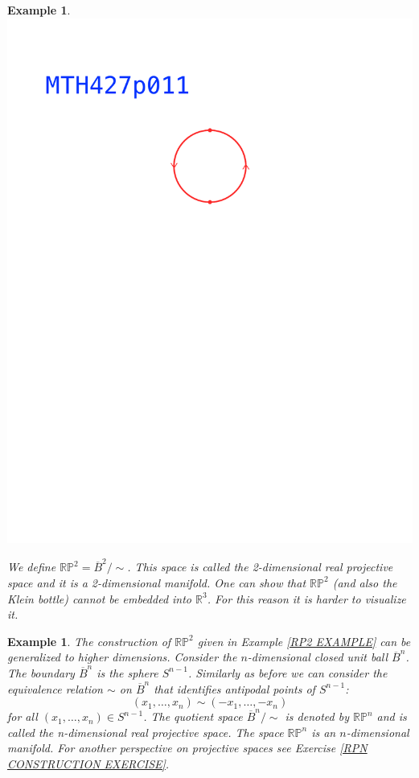 \documentclass[11pt, letterpaper, oneside]{report}
\theoremstyle{pplain}
\newtheorem{ITERMVALUE THM}[theorem]{Intermediate Value Theorem}
\newtheorem{HEINEBOREL THM}[theorem]{Heine-Borel Theorem}
\newtheorem{UMETR THM}[theorem]{Urysohn Metrization Theorem}
\newtheorem{UMETR2 THM}[theorem]{Urysohn Metrization Theorem (v.2)}
\theoremstyle{ddefinition}
\newtheorem{example}[theorem]{Example}
\theoremstyle{nnn}
\newtheorem{TDA NN}[theorem]{Topological Data Analysis. }
\theoremstyle{eexercise}
\newcommand{\R}{{\mathbb R}}
\newcommand{\RP}{{\mathbb R\mathbb P}}
\begin{document}
\begin{example}
{{\includegraphics[width=\textwidth, trim=0mm 180mm 0mm 58mm, clip]{pictures/MTH427p011.pdf}}} 

We define $\RP^{2} = \overline{B}^{2}/{\sim}$. This space is called the \emph{2-dimensional real projective space} and  it is a 2-dimensional manifold. 
One can show that $\RP^{2}$  (and also the Klein bottle) cannot be embedded into $\R^{3}$. For 
this reason it is harder to visualize it.


\end{example}


\begin{example}
\label{RPN EXAMPLE}
The construction of $\RP^{2}$ given in Example \ref{RP2 EXAMPLE}  can be generalized to higher dimensions. 
Consider the $n$-dimensional closed unit ball $\overline{B}^{n}$. The boundary 
$\overline{B}^{n}$ is the sphere $S^{n-1}$. Similarly as before we can consider the equivalence 
relation $\sim$ on $\overline{B}^{n}$  that identifies antipodal points of $S^{n-1}$:
$$(x_{1}, \dots, x_{n})\sim (-x_{1}, \dots, -x_{n})$$
for all $(x_{1}, \dots, x_{n})\in S^{n-1}$. The quotient space $\overline{B}^{n}/{\sim}$ is denoted by 
$\RP^{n}$ and is called the \emph{n-dimensional real projective space}. The space $\RP^{n}$
is an $n$-dimensional manifold.  
For another perspective on projective spaces see Exercise \ref{RPN CONSTRUCTION EXERCISE}.  
\end{example}
\end{document}
